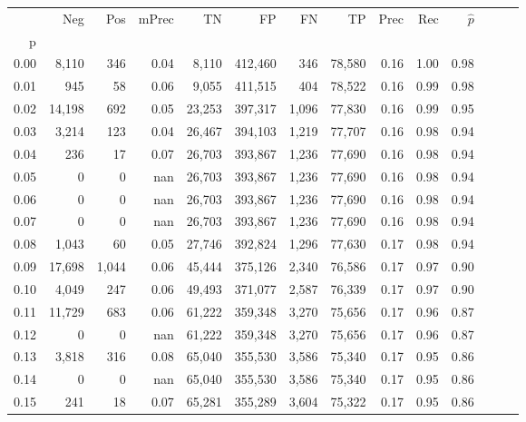 \begin{tabular}{rrrrrrrrrrrrrr}
\toprule
{} &     Neg &    Pos & mPrec &       TN &       FP &      FN &      TP &  Prec &   Rec & $\hat{p}$ \\
p    &         &        &       &          &          &         &         &       &       &           \\
\midrule
0.00 &   8,110 &    346 &  0.04 &    8,110 &  412,460 &     346 &  78,580 &  0.16 &  1.00 &      0.98 \\
0.01 &     945 &     58 &  0.06 &    9,055 &  411,515 &     404 &  78,522 &  0.16 &  0.99 &      0.98 \\
0.02 &  14,198 &    692 &  0.05 &   23,253 &  397,317 &   1,096 &  77,830 &  0.16 &  0.99 &      0.95 \\
0.03 &   3,214 &    123 &  0.04 &   26,467 &  394,103 &   1,219 &  77,707 &  0.16 &  0.98 &      0.94 \\
0.04 &     236 &     17 &  0.07 &   26,703 &  393,867 &   1,236 &  77,690 &  0.16 &  0.98 &      0.94 \\
0.05 &       0 &      0 &   nan &   26,703 &  393,867 &   1,236 &  77,690 &  0.16 &  0.98 &      0.94 \\
0.06 &       0 &      0 &   nan &   26,703 &  393,867 &   1,236 &  77,690 &  0.16 &  0.98 &      0.94 \\
0.07 &       0 &      0 &   nan &   26,703 &  393,867 &   1,236 &  77,690 &  0.16 &  0.98 &      0.94 \\
0.08 &   1,043 &     60 &  0.05 &   27,746 &  392,824 &   1,296 &  77,630 &  0.17 &  0.98 &      0.94 \\
0.09 &  17,698 &  1,044 &  0.06 &   45,444 &  375,126 &   2,340 &  76,586 &  0.17 &  0.97 &      0.90 \\
0.10 &   4,049 &    247 &  0.06 &   49,493 &  371,077 &   2,587 &  76,339 &  0.17 &  0.97 &      0.90 \\
0.11 &  11,729 &    683 &  0.06 &   61,222 &  359,348 &   3,270 &  75,656 &  0.17 &  0.96 &      0.87 \\
0.12 &       0 &      0 &   nan &   61,222 &  359,348 &   3,270 &  75,656 &  0.17 &  0.96 &      0.87 \\
0.13 &   3,818 &    316 &  0.08 &   65,040 &  355,530 &   3,586 &  75,340 &  0.17 &  0.95 &      0.86 \\
0.14 &       0 &      0 &   nan &   65,040 &  355,530 &   3,586 &  75,340 &  0.17 &  0.95 &      0.86 \\
0.15 &     241 &     18 &  0.07 &   65,281 &  355,289 &   3,604 &  75,322 &  0.17 &  0.95 &      0.86 \\

\end{tabular}
